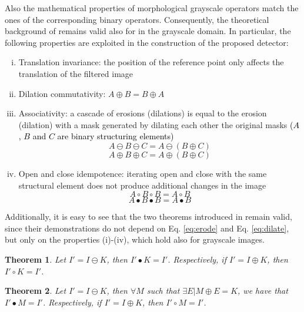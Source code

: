 \documentclass{ieeeaccess}
\newtheorem{theorem}{Theorem}
\newcommand{\revisedtext}[1]{\textcolor{black}{#1}}
\begin{document}
Also the mathematical properties of morphological grayscale operators match the ones of the corresponding binary operators. Consequently, the theoretical background of \cite{de2017detecting} remains valid also for in the grayscale domain. In particular, the following properties are exploited in the construction of the proposed detector:

\begin{enumerate}[(i)]
	\item Translation invariance: the position of the reference point only affects the translation of the filtered image
	\item Dilation commutativity: $A\oplus B = B \oplus A$
	\item Associativity: a cascade of erosions (dilations) is equal to the erosion (dilation) with a mask generated by dilating each other the original masks \revisedtext{($A$, $B$ and $C$ are binary structuring elements)}
	\begin{equation}
	A \ominus B \ominus C = A \ominus (B \oplus C)
	\end{equation}
	\vspace{-0.5cm}
	\begin{equation}
	A \oplus B \oplus C = A \oplus (B \oplus C)
	\end{equation} 
	\item Open and close idempotence: iterating open and close with the same structural element does not produce additional changes in the image
	\begin{equation}
	A \circ B \circ B = A \circ B
	\end{equation}
	\vspace{-0.5cm}
	\begin{equation}
	A \bullet B \bullet B = A \bullet B
	\end{equation} 
\end{enumerate}

Additionally, it is easy to see that the two theorems introduced in \cite{de2017detecting} remain valid, since their demonstrations do not depend on Eq. \ref{eq:erode} and Eq. \ref{eq:dilate}, but only on the properties (i)-(iv), which hold also for grayscale images.

\begin{theorem}
	\label{theorem_1}
	Let $I' = I \ominus K$, then $I'\bullet K = I'$. Respectively, if $I' = I \oplus K$, then $I'\circ K = I'$.
\end{theorem}

\begin{theorem}
	\label{theorem_2}
	Let $I' = I \ominus K$, then $\forall M$ such that $\exists E | M \oplus E = K$, we have that $I' \bullet M = I'$. Respectively, if $I' = I \oplus K$, then $I' \circ M = I'$.
\end{theorem}
\end{document}
